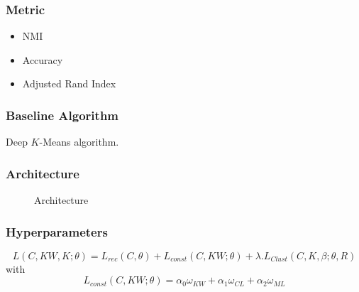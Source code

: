 \documentclass{beamer}
\begin{document}
\begin{frame}
\frametitle{Metric}
\begin{itemize}
\item NMI
\item Accuracy
\item Adjusted Rand Index
\end{itemize}
\end{frame}

\begin{frame}
\frametitle{Baseline Algorithm}
Deep $K$-Means algorithm.
\end{frame}

\begin{frame}
\frametitle{Architecture}
\begin{figure}[!h]
  \centering
  \caption{\label{fig:archi}Architecture}
\end{figure}
\end{frame}

\begin{frame}
\frametitle{Hyperparameters}
\begin{equation*}
L(C,KW, K; \theta) = L_{rec}(C, \theta) + L_{const}(C, KW;\theta) + \lambda.L_{Clust}(C, K, \beta; \theta, R)
\end{equation*}
with
\begin{equation*}
L_{const}(C, KW;\theta) = \alpha_0\omega_{KW} + \alpha_1\omega_{CL} + \alpha_2\omega_{ML}
\end{equation*}
\begin{table}[!h]
\centering
{}
\end{table}
\end{frame}
\end{document}
